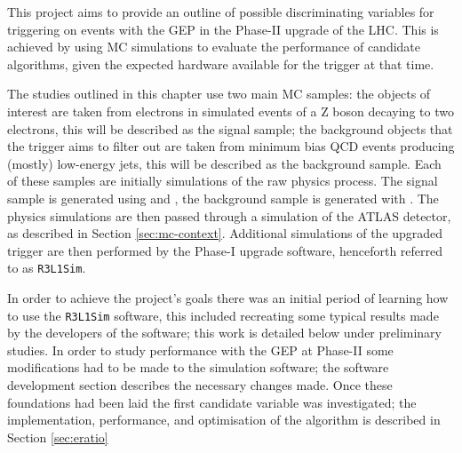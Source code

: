 
This project aims to provide an outline of possible discriminating variables for 
triggering on \egamma events with the GEP in the Phase-II upgrade of the LHC. This
is achieved by using MC simulations to evaluate the performance of candidate
algorithms, given the expected hardware available for the trigger at that time.

The studies outlined in this chapter use two main MC samples: the objects of interest are
taken from electrons in simulated events of a Z boson decaying to two electrons, this will
be described as the signal sample; the background objects that the trigger aims to filter out
are taken from minimum bias QCD events producing (mostly) low-energy jets, this will be described
as the background sample. Each of these samples are initially simulations of the raw physics
process. The signal sample is generated using
\powheg\cite{Frixione2007}
and \pythia \cite{Sjostrand2006, Sjostrand2008},
the background sample is generated with \pythia.
The physics simulations are then passed through a simulation of the ATLAS detector,
as described in Section \ref{sec:mc-context}.
Additional simulations of the upgraded trigger are then performed by the Phase-I upgrade
software, henceforth referred to as \texttt{R3L1Sim}.

In order to achieve the project's goals there was an initial period of learning how
to use the \texttt{R3L1Sim} software, this included
recreating some typical results made by the developers of the software; this work is
detailed below under preliminary studies. In order to study \egamma performance with the GEP
at Phase-II some modifications had to be made to the simulation software; the software
development section describes the necessary changes made. Once these foundations had been laid
the first candidate variable was investigated; the implementation, performance, and optimisation
of the \eratio algorithm is described in Section \ref{sec:eratio}
